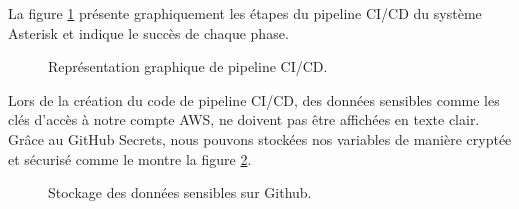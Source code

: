 La figure \ref{fig:s} présente graphiquement les étapes du pipeline CI/CD du système Asterisk et indique le succès de chaque phase.
\begin{figure}[H]
        \centering
        \caption{Représentation graphique de pipeline CI/CD.}
        \label{fig:s}
\end{figure}
Lors de la création du code de pipeline CI/CD, des données sensibles comme les clés d'accès à notre compte AWS, ne doivent pas être affichées en texte clair. Grâce au GitHub Secrets, nous pouvons stockées nos variables de manière cryptée et sécurisé comme le montre la figure \ref{fig:secrets}.
\begin{figure}[H]
        \centering
        \caption{Stockage des données sensibles sur Github.}
        \label{fig:secrets}
\end{figure}

